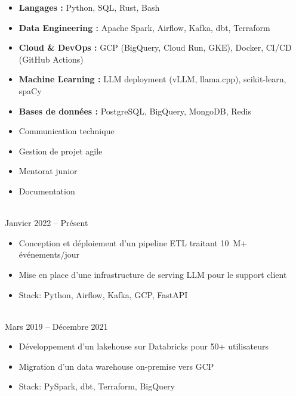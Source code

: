 \begin{itemize}
    \item \textbf{Langages :}
        Python, SQL, Rust, Bash

    \item \textbf{Data Engineering :}
        Apache Spark, Airflow, Kafka, dbt, Terraform

    \item \textbf{Cloud \& DevOps :}
        GCP (BigQuery, Cloud Run, GKE), Docker, CI/CD (GitHub Actions)

    \item \textbf{Machine Learning :}
        LLM deployment (vLLM, llama.cpp), scikit-learn, spaCy

    \item \textbf{Bases de données :}
        PostgreSQL, BigQuery, MongoDB, Redis
\end{itemize}


\begin{itemize}
    \item Communication technique
    \item Gestion de projet agile
    \item Mentorat junior
    \item Documentation
\end{itemize}


{\\ Janvier 2022 -- Présent}
\begin{itemize}
    \item Conception et déploiement d'un pipeline ETL traitant 10~M+ événements/jour
    \item Mise en place d'une infrastructure de serving LLM pour le support client
    \item Stack: Python, Airflow, Kafka, GCP, FastAPI
\end{itemize}

{\\ Mars 2019 -- Décembre 2021}
\begin{itemize}
    \item Développement d'un lakehouse sur Databricks pour 50+ utilisateurs
    \item Migration d'un data warehouse on-premise vers GCP
    \item Stack: PySpark, dbt, Terraform, BigQuery
\end{itemize}

